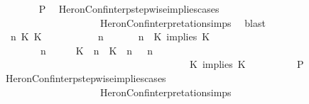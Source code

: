 \begin{isabellebody}
\ \ \ \ \ \ \isamarkupfalse%
\ {\isacharquery}P\ \isamarkupfalse%
\ HeronConf{\isacharunderscore}interp{\isacharunderscore}stepwise{\isacharunderscore}implies{\isacharunderscore}cases\isanewline
\ \ \ \ \ \ \ \ \ \ \ \ \ \ \ \ \ \ \ \ HeronConf{\isacharunderscore}interpretation{\isachardot}simps\ \isamarkupfalse%
\ blast\isanewline
\ \ \ \ \isamarkupfalse%
\isanewline
\ \ \ \ \ \ \isamarkupfalse%
\ {\isasymGamma}\ n\ K\ K\ {\isasymPsi}\ {\isasymPhi}\isanewline
\ \ \ \ \ \ \isamarkupfalse%
\ {\isacartoucheopen}{\isacharparenleft}{\isasymGamma}\ n\ {\isasymturnstile}\ {\isasymPsi}\ {\isasymtriangleright}\ {\isasymPhi}\ {\isacharequal}\ {\isacharparenleft}{\isasymGamma}{\isacharcomma}\ n\ {\isasymturnstile}\ {\isacharparenleft}{\isacharparenleft}K\ implies\ K\ {\isacharhash}\ {\isasymPsi}{\isacharparenright}\ {\isasymtriangleright}\ {\isasymPhi}{\isacharparenright}{\isacartoucheclose}\isanewline
\ \ \ \ \ \ \ {\isacartoucheopen}{\isacharparenleft}{\isasymGamma}\ n\ {\isasymturnstile}\ {\isasymPsi}\ {\isasymtriangleright}\ {\isasymPhi}\ {\isacharequal}\ {\isacharparenleft}{\isacharparenleft}{\isacharparenleft}K\ {\isasymUp}\ n{\isacharparenright}\ {\isacharhash}\ {\isacharparenleft}K\ {\isasymUp}\ n{\isacharparenright}\ {\isacharhash}\ {\isasymGamma}{\isacharparenright}{\isacharcomma}\ n\isanewline
\ \ \ \ \ \ \ \ \ \ \ \ \ \ \ \ \ \ \ \ \ \ \ \ \ \ \ \ \ \ \ \ \ \ \ {\isasymturnstile}\ {\isasymPsi}\ {\isasymtriangleright}\ {\isacharparenleft}{\isacharparenleft}K\ implies\ K\ {\isacharhash}\ {\isasymPhi}{\isacharparenright}{\isacharparenright}{\isacartoucheclose}\isanewline
\ \ \ \ \ \ \isamarkupfalse%
\ {\isacharquery}P\ \isamarkupfalse%
\ HeronConf{\isacharunderscore}interp{\isacharunderscore}stepwise{\isacharunderscore}implies{\isacharunderscore}cases\isanewline
\ \ \ \ \ \ \ \ \ \ \ \ \ \ \ \ \ \ \ \ HeronConf{\isacharunderscore}interpretation{\isachardot}simps\ \isamarkupfalse%

\end{isabellebody}
